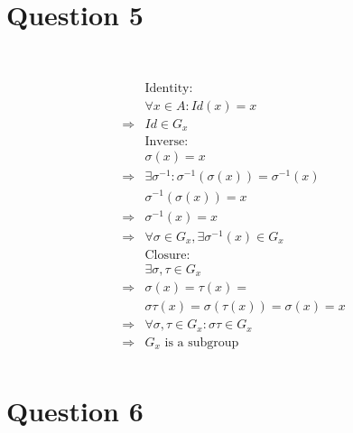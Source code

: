 \documentclass{article}
\begin{document}
\newpage

\section*{Question 5}

~

\begin{equation*}
    \begin{split}
        &\text{Identity}:\\
        &\forall x\in A:Id(x)=x\\
        \Rightarrow&Id\in G_x\\
        &\text{Inverse}:\\
        &\sigma(x)=x\\
        \Rightarrow&\exists\sigma^{-1}:\sigma^{-1}(\sigma(x))=\sigma^{-1}(x)\\
        &\sigma^{-1}(\sigma(x))=x\\
        \Rightarrow&\sigma^{-1}(x)=x\\
        \Rightarrow&\forall \sigma\in G_x,\exists\sigma^{-1}(x)\in G_x\\
        &\text{Closure}:\\
        &\exists \sigma,\tau\in G_x\\
        \Rightarrow&\sigma(x)=\tau(x)=\\
        &\sigma\tau(x)=\sigma(\tau(x))=\sigma(x)=x\\
        \Rightarrow&\forall \sigma,\tau\in G_x:\sigma\tau\in G_x\\
        \Rightarrow&G_x\text{ is a subgroup}\\
    \end{split}
\end{equation*}

\newpage

\section*{Question 6}

~
\end{document}
